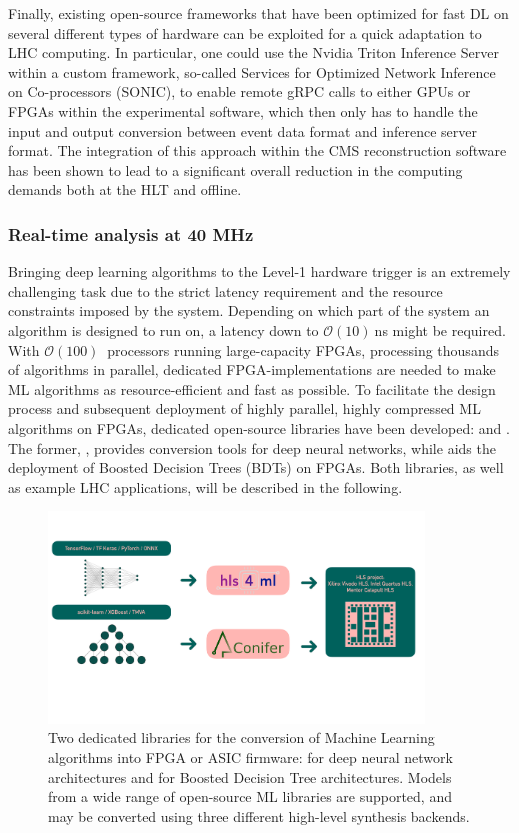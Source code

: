 Finally, existing open-source frameworks that have been optimized for fast DL on several different types of hardware can be exploited for a quick adaptation to LHC computing. In particular, one could use the Nvidia Triton Inference Server within a custom framework, so-called Services for Optimized Network Inference on Co-processors (SONIC), to enable remote gRPC calls to either GPUs or FPGAs within the experimental software, which then only has to handle the input and output conversion between event data format and inference server format. 
The integration of this approach within the CMS reconstruction software has been shown to lead to a significant overall reduction in the computing demands both at the HLT and offline.

\subsubsection{Real-time analysis at 40 MHz}
Bringing deep learning algorithms to the Level-1 hardware trigger is an extremely challenging task due to the strict latency requirement and the resource constraints imposed by the system. Depending on which part of the system an algorithm is designed to run on, a latency down to $\mathcal{O}(10)~$ns might be required.  
With $\mathcal{O}(100)~$ processors running large-capacity FPGAs, processing thousands of algorithms in parallel, dedicated FPGA-implementations are needed to make ML algorithms as resource-efficient and fast as possible.
To facilitate the design process and subsequent deployment of highly parallel, highly compressed ML algorithms on FPGAs, dedicated open-source libraries have been developed: \hlsfml and \conifer. 
The former, \hlsfml, provides conversion tools for deep neural networks, while \conifer aids the deployment of Boosted Decision Trees (BDTs) on FPGAs. Both libraries, as well as example LHC applications, will be described in the following.
\begin{figure}[htb]
    \centering
    \includegraphics[width=0.89\textwidth]{figures/hls4ml_conifer.pdf}
    \caption{Two dedicated libraries for the conversion of Machine Learning algorithms into FPGA or ASIC firmware: \hlsfml for deep neural network architectures and \conifer for Boosted Decision Tree architectures. Models from a wide range of open-source ML libraries are supported, and may be converted using three different high-level synthesis backends.}
    \label{figs2:libraries}
\end{figure}

